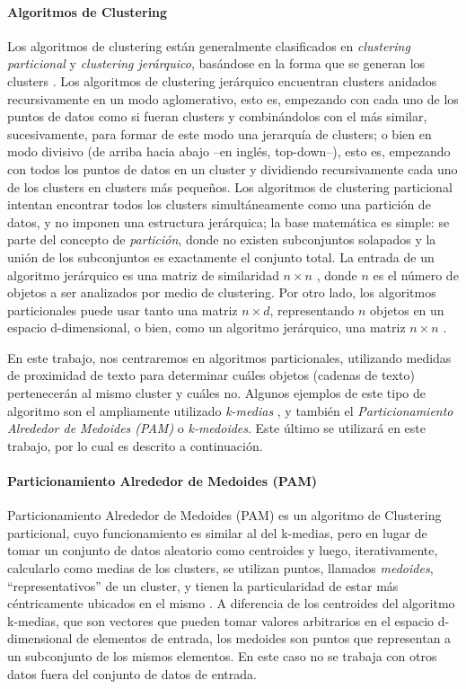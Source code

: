 \paragraph{Algoritmos de Clustering}\label{sec:algoritmos_clustering}
Los algoritmos de clustering están generalmente clasificados en \textit{clustering particional} y \textit{clustering jerárquico}, basándose en la forma que se generan los clusters \citep{xu2008clustering}. Los algoritmos de clustering jerárquico encuentran clusters anidados recursivamente en un modo aglomerativo, esto es, empezando con cada uno de los puntos de datos como si fueran clusters y combinándolos con el más similar, sucesivamente, para formar de este modo una jerarquía de clusters; o bien en modo divisivo (de arriba hacia abajo --en inglés, top-down--), esto es, empezando con todos los puntos de datos en un cluster y dividiendo recursivamente cada uno de los clusters en clusters más pequeños. Los algoritmos de clustering particional intentan encontrar todos los clusters simultáneamente como una partición de datos, y no imponen una estructura jerárquica; la base matemática es simple: se parte del concepto de \textit{partición}, donde no existen subconjuntos solapados y la unión de los subconjuntos es exactamente el conjunto total. La entrada de un algoritmo jerárquico es una matriz de similaridad \(n \times n\) , donde \(n\) es el número de objetos a ser analizados por medio de clustering. Por otro lado, los algoritmos particionales puede usar tanto una matriz \(n \times d\), representando \(n\) objetos en un espacio d-dimensional, o bien, como un algoritmo jerárquico, una matriz \(n \times n\) \citep{jain2010data}.

\bigskip En este trabajo, nos centraremos en algoritmos particionales, utilizando medidas de proximidad de texto para determinar cuáles objetos (cadenas de texto) pertenecerán al mismo cluster y cuáles no. Algunos ejemplos de este tipo de algoritmo son el ampliamente utilizado \textit{k-medias} \citep{macqueen1967some}, y también el \textit{Particionamiento Alrededor de Medoides (PAM)} o \textit{k-medoides}. Este último se utilizará en este trabajo, por lo cual es descrito a continuación.

\paragraph{Particionamiento Alrededor de Medoides (PAM)}
Particionamiento Alrededor de Medoides (PAM) es un algoritmo de Clustering particional, cuyo funcionamiento es similar al del k-medias, pero en lugar de tomar un conjunto de datos aleatorio como centroides y luego, iterativamente, calcularlo como medias de los clusters, se utilizan puntos, llamados \textit{medoides}, “representativos” de un cluster, y tienen la particularidad de estar más céntricamente ubicados en el mismo \citep{rdusseeun1987clustering}. A diferencia de los centroides del algoritmo k-medias, que son vectores que pueden tomar valores arbitrarios en el espacio d-dimensional de elementos de entrada, los medoides son puntos que representan a un subconjunto de los mismos elementos. En este caso no se trabaja con otros datos fuera del conjunto de datos de entrada.

